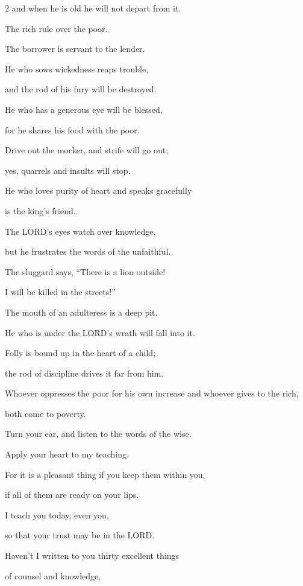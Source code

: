 \begin{multicols}{2}
and when he is old he will not depart from it.


\myverse{}The rich rule over the poor.

The borrower is servant to the lender.


\myverse{}He who sows wickedness reaps trouble,

and the rod of his fury will be destroyed.


\myverse{}He who has a generous eye will be blessed,

for he shares his food with the poor.


\myverse{}Drive out the mocker, and strife will go out;

yes, quarrels and insults will stop.


\myverse{}He who loves purity of heart and speaks gracefully

is the king’s friend.


\myverse{}The LORD’s eyes watch over knowledge,

but he frustrates the words of the unfaithful.


\myverse{}The sluggard says, “There is a lion outside!

I will be killed in the streets!”


\myverse{}The mouth of an adulteress is a deep pit.

He who is under the LORD’s wrath will fall into it.


\myverse{}Folly is bound up in the heart of a child;

the rod of discipline drives it far from him.


\myverse{}Whoever oppresses the poor for his own increase and whoever
gives to the rich,

both come to poverty.


\vspace{\baselineskip} 
\myverse{}Turn your ear, and listen to the words of the wise.

Apply your heart to my teaching.


\myverse{}For it is a pleasant thing if you keep them within you,

if all of them are ready on your lips.


\myverse{}I teach you today, even you,

so that your trust may be in the LORD.


\myverse{}Haven’t I written to you thirty excellent things

of counsel and knowledge,



\end{multicols}
